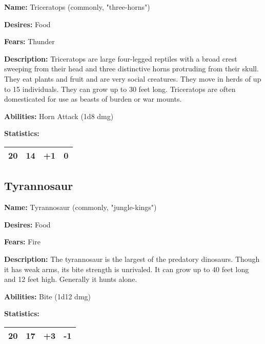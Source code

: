 \begin{multicols}{2}
\textbf{Name:} Triceratops (commonly, "three-horns") 

\textbf{Desires:} Food

\textbf{Fears:} Thunder

\textbf{Description:} Triceratops are large four-legged reptiles with a broad crest sweeping from
their head and three distinctive horns protruding from their skull. They eat plants and fruit and
are very social creatures. They move in herds of up to 15 individuals. They can grow up to 30 feet
long. Triceratops are often domesticated for use as beasts of burden or war mounts.

\textbf{Abilities:} Horn Attack (1d8 dmg)

\textbf{Statistics:}

\begin{center}
{
\begin{xtabular}{|l|l|l|l|}
20 & 14 & +1 & 0 \\
\hline
\end{xtabular}
}
\end{center}

\subsection{Tyrannosaur}

\textbf{Name:} Tyrannosaur (commonly, "jungle-kings") 

\textbf{Desires:} Food

\textbf{Fears:} Fire

\textbf{Description:} The tyrannosaur is the largest of the predatory dinosaurs. Though
it has weak arms, its bite strength is unrivaled. It can grow up to 40 feet long and 12
feet high. Generally it hunts alone.

\textbf{Abilities:} Bite (1d12 dmg)

\textbf{Statistics:}

\begin{center}
{
\begin{xtabular}{|l|l|l|l|}
20 & 17 & +3 & -1 \\
\hline
\end{xtabular}
}
\end{center}


\end{multicols}
